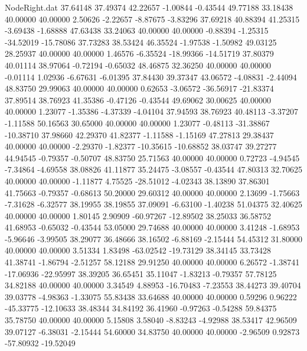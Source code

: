 \begin{filecontents}{NodeRight.dat}
  37.64148   37.49374   42.22657    -1.00844   -0.43544   49.77188   33.18438   40.00000   40.00000    2.50626   -2.22657   -8.87675   -3.83296
  37.69218   40.88394   41.25315    -3.69438   -1.68888   47.63438   33.24063   40.00000   40.00000   -0.88394   -1.25315  -34.52019  -15.78086
  37.73283   38.53424   46.35524    -1.97538   -1.50982   49.03125   28.25937   40.00000   40.00000    1.46576   -6.35524  -18.99366  -14.51719
  37.80379   40.01114   38.97064    -0.72194   -0.65032   48.46875   32.36250   40.00000   40.00000   -0.01114    1.02936   -6.67631   -6.01395
  37.84430   39.37347   43.06572    -4.08831   -2.44094   48.83750   29.99063   40.00000   40.00000    0.62653   -3.06572  -36.56917  -21.83374
  37.89514   38.76923   41.35386    -0.47126   -0.43544   49.69062   30.00625   40.00000   40.00000    1.23077   -1.35386   -4.37339   -4.04104
  37.94593   38.76923   40.48113    -3.37207   -1.11588   50.16563   30.65000   40.00000   40.00000    1.23077   -0.48113  -31.38867  -10.38710
  37.98660   42.29370   41.82377    -1.11588   -1.15169   47.27813   29.38437   40.00000   40.00000   -2.29370   -1.82377  -10.35615  -10.68852
  38.03747   39.27277   44.94545    -0.79357   -0.50707   48.83750   25.71563   40.00000   40.00000    0.72723   -4.94545   -7.34864   -4.69558
  38.08826   41.11877   35.24475    -3.08557   -0.43544   47.80313   32.70625   40.00000   40.00000   -1.11877    4.75525  -28.51012   -4.02343
  38.13890   37.86301   41.75663    -0.79357   -0.68613   50.20000   29.60312   40.00000   40.00000    2.13699   -1.75663   -7.31628   -6.32577
  38.19955   38.19855   37.09091    -6.63100   -1.40238   51.04375   32.40625   40.00000   40.00000    1.80145    2.90909  -60.97267  -12.89502
  38.25033   36.58752   41.68953    -0.65032   -0.43544   53.05000   29.74688   40.00000   40.00000    3.41248   -1.68953   -5.96646   -3.99505
  38.29077   36.48666   38.16502    -6.88169   -2.15444   54.45312   31.80000   40.00000   40.00000    3.51334    1.83498  -63.02542  -19.73129
  38.34145   33.73428   41.38741    -1.86794   -2.51257   58.12188   29.91250   40.00000   40.00000    6.26572   -1.38741  -17.06936  -22.95997
  38.39205   36.65451   35.11047    -1.83213   -0.79357   57.78125   34.82188   40.00000   40.00000    3.34549    4.88953  -16.70483   -7.23553
  38.44273   39.40704   39.03778    -4.98363   -1.33075   55.83438   33.64688   40.00000   40.00000    0.59296    0.96222  -45.33775  -12.10633
  38.48344   34.84192   36.41960    -0.97263   -0.54288   59.84375   35.78750   40.00000   40.00000    5.15808    3.58040   -8.83243   -4.92988
  38.53417   42.96509   39.07127    -6.38031   -2.15444   54.60000   34.83750   40.00000   40.00000   -2.96509    0.92873  -57.80932  -19.52049

\end{filecontents}
